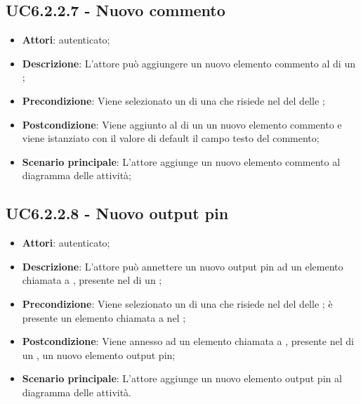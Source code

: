 \subsection{UC6.2.2.7 - Nuovo commento}
\label{ssec:UC6.2.2.7}
\begin{itemize}
\item \textbf{Attori}:  autenticato;
\item \textbf{Descrizione}: L'attore può aggiungere un nuovo elemento commento al  di un ;
\item \textbf{Precondizione}: Viene selezionato un  di una  che risiede nel  del  delle  ;
\item \textbf{Postcondizione}: Viene aggiunto al  di un  un nuovo elemento commento e viene istanziato con il valore di default il campo testo del commento;
\item \textbf{Scenario principale}: L'attore aggiunge un nuovo elemento commento al diagramma delle attività;
\end{itemize}
\subsection{UC6.2.2.8 - Nuovo output pin}
\label{ssec:UC6.2.2.8}
\begin{itemize}
\item \textbf{Attori}:  autenticato;
\item \textbf{Descrizione}: L'attore può annettere un nuovo output pin ad un elemento chiamata a , presente nel  di un ;
\item \textbf{Precondizione}: Viene selezionato un  di una  che risiede nel  del  delle  ; è presente un elemento chiamata a  nel ;
\item \textbf{Postcondizione}: Viene annesso ad un elemento chiamata a , presente nel  di un , un nuovo elemento output pin;
\item \textbf{Scenario principale}: L'attore aggiunge un nuovo elemento output pin al diagramma delle attività.
\end{itemize}
\newpage
